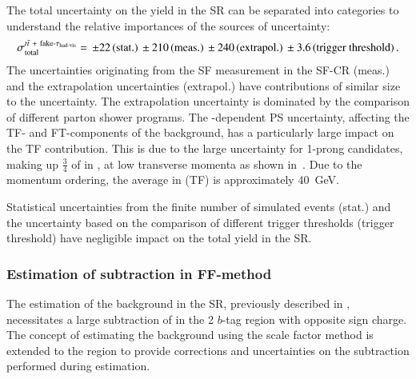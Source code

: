 The total uncertainty on the \ttbarFakes yield in the SR can be
separated into categories to understand the relative importances of
the sources of uncertainty:
\begin{align*}
  \sigma_\text{total}^{\ttbarFakes} = \valuesep\numerrt{22}{stat.}%
  \valuesep\numerrt{210}{meas.}%
  \valuesep\numerrt{240}{extrapol.}%
  \valuesep\numerrt{3.6}{trigger threshold} \,\text{.}
\end{align*}
The uncertainties originating from the SF measurement in the SF-CR
(meas.) and the extrapolation uncertainties (extrapol.) have
contributions of similar size to the uncertainty. The extrapolation
uncertainty is dominated by the comparison of different parton shower
programs. The \faketauhadvis \pT-dependent PS uncertainty, affecting
the TF- and FT-components of the background, has a particularly large
impact on the TF contribution. This is due to the large uncertainty
for 1-prong \faketauhadvis candidates, making up $\frac{3}{4}$ of
\faketauhadvis in \ttbar, at low transverse momenta as shown
in~. Due to the momentum ordering,
the average \faketauhadvis \pT in \ttbarFakes (TF) is approximately
\SI{40}{\GeV}.

Statistical uncertainties from the finite number of simulated events
(stat.) and the uncertainty based on the comparison of different
trigger thresholds (trigger threshold) have negligible impact on the
total yield in the \hadhad SR.





\subsubsection{Estimation of \ttbarFakes subtraction in FF-method}

The estimation of the \multijet background in the \hadhad SR,
previously described in , necessitates a
large subtraction of \ttbarFakes in the 2 $b$-tag \antiid region with
opposite sign \tauhadvis charge. The concept of estimating the
\ttbarFakes background using the scale factor method is extended to
the \antiid region to provide corrections and uncertainties on the
subtraction performed during \multijet estimation.

